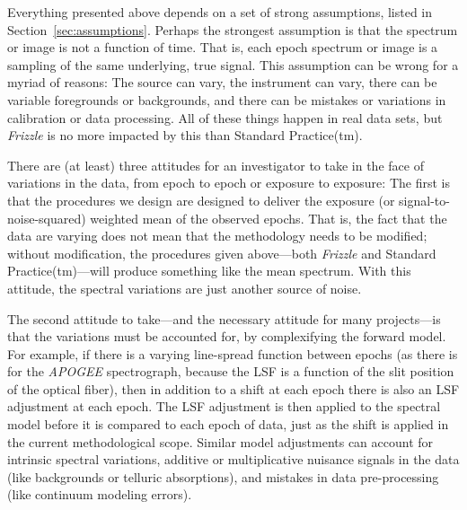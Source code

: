 \documentclass[modern, linenumbers]{aastex631}
\newcommand{\sectionname}{Section}
\newcommand{\secref}[1]{\sectionname~\ref{#1}}
\newcommand{\name}{\textsl{Frizzle}}
\begin{document}
Everything presented above depends on a set of strong assumptions, listed in \secref{sec:assumptions}.
Perhaps the strongest assumption is that the spectrum or image is not a function of time.
That is, each epoch spectrum or image is a sampling of the same underlying, true signal.
This assumption can be wrong for a myriad of reasons:
The source can vary, the instrument can vary, there can be variable foregrounds or backgrounds, and there can be mistakes or variations in calibration or data processing.
All of these things happen in real data sets, but \name{} is no more impacted by this than Standard Practice(tm).

There are (at least) three attitudes for an investigator to take in the face of variations in the data, from epoch to epoch or exposure to exposure:
The first is that the procedures we design are designed to deliver the exposure (or signal-to-noise-squared) weighted mean of the observed epochs.
That is, the fact that the data are varying does not mean that the methodology needs to be modified; without modification, the procedures given above---both \name{} and Standard Practice(tm)---will produce something like the mean spectrum.
With this attitude, the spectral variations are just another source of noise.

The second attitude to take---and the necessary attitude for many projects---is that the variations must be accounted for, by complexifying the forward model.
For example, if there is a varying line-spread function between epochs (as there is for the \textsl{APOGEE} spectrograph, because the LSF is a function of the slit position of the optical fiber), then in addition to a shift at each epoch there is also an LSF adjustment at each epoch.
The LSF adjustment is then applied to the spectral model before it is compared to each epoch of data, just as the shift is applied in the current methodological scope.
Similar model adjustments can account for intrinsic spectral variations, additive or multiplicative nuisance signals in the data (like backgrounds or telluric absorptions), and mistakes in data pre-processing (like continuum modeling errors).
\end{document}
